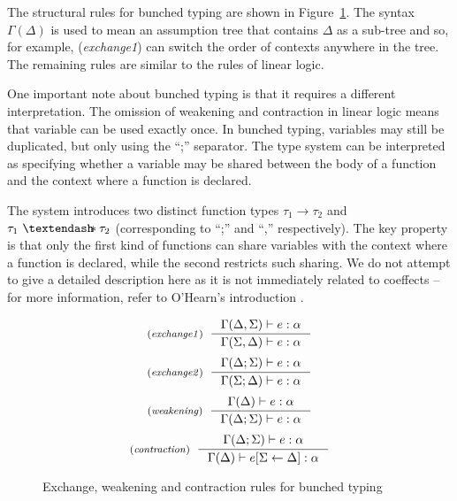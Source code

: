 The structural rules for bunched typing are shown in Figure~\ref{fig:substructural-bunched}.
The syntax $\Gamma(\Delta)$ is used to mean an assumption tree that contains $\Delta$ as a 
sub-tree and so, for example, (\emph{exchange1}) can switch the order of contexts anywhere in the
tree. The remaining rules are similar to the rules of linear logic.

One important note about bunched typing is that it requires a different interpretation. The omission
of weakening and contraction in linear logic means that variable can be used exactly once. 
In bunched typing, variables may still be duplicated, but only using the ``;'' separator.
The type system can be interpreted as specifying whether a variable may be shared between the 
body of a function and the context where a function is declared. 

The system introduces two 
distinct function types $\tau_1 \rightarrow \tau_2$ and $\tau_1~ \textendash\!\!\!\ast \tau_2$
(corresponding to ``;'' and ``,'' respectively). The key property is that only the first kind
of functions can share variables with the context where a function is declared, while the second
restricts such sharing. We do not attempt to give a detailed description here as it is not 
immediately related to coeffects -- for more information, refer to O'Hearn's introduction 
\cite{substruct-bunched}.

\begin{figure}
\begin{equation*}
\tyrule{exchange1}
  {\Gamma(\Delta, \Sigma) \vdash e : \alpha}
  {\Gamma(\Sigma, \Delta) \vdash e : \alpha}
\end{equation*}
\begin{equation*}
\tyrule{exchange2}
  {\Gamma(\Delta; \Sigma) \vdash e : \alpha}
  {\Gamma(\Sigma; \Delta) \vdash e : \alpha}
\end{equation*}
\begin{equation*}
\tyrule{weakening}
  {\Gamma(\Delta) \vdash e : \alpha}
  {\Gamma(\Delta; \Sigma) \vdash e : \alpha}
\end{equation*}
\begin{equation*}
\tyrule{contraction}
  {\Gamma(\Delta; \Sigma) \vdash e : \alpha}
  {\Gamma(\Delta) \vdash \subst{e}{\Sigma}{\Delta} : \alpha}
\end{equation*}
\caption{Exchange, weakening and contraction rules for bunched typing}
\label{fig:substructural-bunched}
\end{figure}


